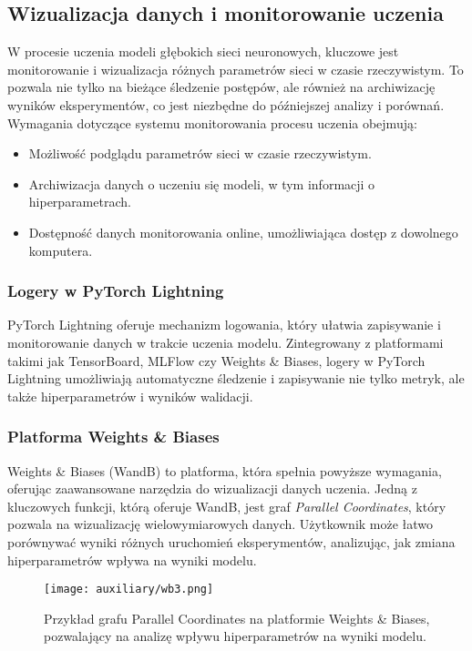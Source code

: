 \documentclass[12pt,twoside]{article}
\begin{document}
\subsection{Wizualizacja danych i monitorowanie uczenia}
W procesie uczenia modeli głębokich sieci neuronowych, kluczowe jest monitorowanie i wizualizacja różnych parametrów sieci w czasie rzeczywistym. To pozwala nie tylko na bieżące śledzenie postępów, ale również na archiwizację wyników eksperymentów, co jest niezbędne do późniejszej analizy i porównań. Wymagania dotyczące systemu monitorowania procesu uczenia obejmują:
\begin{itemize}
    \item Możliwość podglądu parametrów sieci w czasie rzeczywistym.
    \item Archiwizacja danych o uczeniu się modeli, w tym informacji o hiperparametrach.
    \item Dostępność danych monitorowania online, umożliwiająca dostęp z dowolnego komputera.
\end{itemize}

\subsubsection{Logery w PyTorch Lightning}
PyTorch Lightning oferuje mechanizm logowania, który ułatwia zapisywanie i monitorowanie danych w trakcie uczenia modelu. Zintegrowany z platformami takimi jak TensorBoard, MLFlow czy Weights \& Biases, logery w PyTorch Lightning umożliwiają automatyczne śledzenie i zapisywanie nie tylko metryk, ale także hiperparametrów i wyników walidacji. 

\subsubsection{Platforma Weights \& Biases}
Weights \& Biases (WandB) to platforma, która spełnia powyższe wymagania, oferując zaawansowane narzędzia do wizualizacji danych uczenia. Jedną z kluczowych funkcji, którą oferuje WandB, jest graf \textit{Parallel Coordinates}, który pozwala na wizualizację wielowymiarowych danych. Użytkownik może łatwo porównywać wyniki różnych uruchomień eksperymentów, analizując, jak zmiana hiperparametrów wpływa na wyniki modelu.

\begin{figure}[ht]
    \centering
    \texttt{[image: auxiliary/wb3.png]}
    \caption{Przykład grafu Parallel Coordinates na platformie Weights \& Biases, pozwalający na analizę wpływu hiperparametrów na wyniki modelu.}
    \label{fig:parallel_coordinates}
\end{figure}
\end{document}
